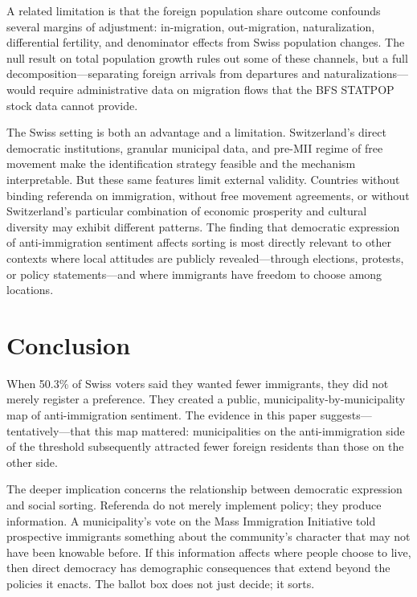\documentclass[12pt]{article}
\begin{document}
A related limitation is that the foreign population share outcome confounds several margins of adjustment: in-migration, out-migration, naturalization, differential fertility, and denominator effects from Swiss population changes. The null result on total population growth rules out some of these channels, but a full decomposition---separating foreign arrivals from departures and naturalizations---would require administrative data on migration flows that the BFS STATPOP stock data cannot provide.

The Swiss setting is both an advantage and a limitation. Switzerland's direct democratic institutions, granular municipal data, and pre-MII regime of free movement make the identification strategy feasible and the mechanism interpretable. But these same features limit external validity. Countries without binding referenda on immigration, without free movement agreements, or without Switzerland's particular combination of economic prosperity and cultural diversity may exhibit different patterns. The finding that democratic expression of anti-immigration sentiment affects sorting is most directly relevant to other contexts where local attitudes are publicly revealed---through elections, protests, or policy statements---and where immigrants have freedom to choose among locations.


\section{Conclusion}

When 50.3\% of Swiss voters said they wanted fewer immigrants, they did not merely register a preference. They created a public, municipality-by-municipality map of anti-immigration sentiment. The evidence in this paper suggests---tentatively---that this map mattered: municipalities on the anti-immigration side of the threshold subsequently attracted fewer foreign residents than those on the other side.

The deeper implication concerns the relationship between democratic expression and social sorting. Referenda do not merely implement policy; they produce information. A municipality's vote on the Mass Immigration Initiative told prospective immigrants something about the community's character that may not have been knowable before. If this information affects where people choose to live, then direct democracy has demographic consequences that extend beyond the policies it enacts. The ballot box does not just decide; it sorts.
\end{document}
